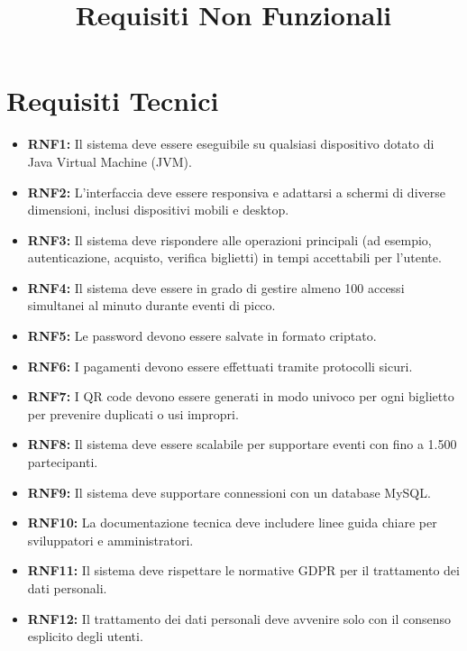 \documentclass[a4paper,12pt]{article}
\title{\textcolor{titlecolor}{\Huge Requisiti Non Funzionali \vspace{0.2cm}}}
\author{}
\date{}
\begin{document}
\maketitle

\section*{\textcolor{sectioncolor}{Requisiti Tecnici}}
\textcolor{textcolor}{
\begin{itemize}
    \item \textbf{RNF1:} Il sistema deve essere eseguibile su qualsiasi dispositivo dotato di Java Virtual Machine (JVM).
    \item \textbf{RNF2:} L'interfaccia deve essere responsiva e adattarsi a schermi di diverse dimensioni, inclusi dispositivi mobili e desktop.
    \item \textbf{RNF3:} Il sistema deve rispondere alle operazioni principali (ad esempio, autenticazione, acquisto, verifica biglietti) in tempi accettabili per l'utente.
    \item \textbf{RNF4:} Il sistema deve essere in grado di gestire almeno 100 accessi simultanei al minuto durante eventi di picco.
    \item \textbf{RNF5:} Le password devono essere salvate in formato criptato.
    \item \textbf{RNF6:} I pagamenti devono essere effettuati tramite protocolli sicuri.
    \item \textbf{RNF7:} I QR code devono essere generati in modo univoco per ogni biglietto per prevenire duplicati o usi impropri.
    \item \textbf{RNF8:} Il sistema deve essere scalabile per supportare eventi con fino a 1.500 partecipanti.
    \item \textbf{RNF9:} Il sistema deve supportare connessioni con un database MySQL.
    \item \textbf{RNF10:} La documentazione tecnica deve includere linee guida chiare per sviluppatori e amministratori.
    \item \textbf{RNF11:} Il sistema deve rispettare le normative GDPR per il trattamento dei dati personali.
    \item \textbf{RNF12:} Il trattamento dei dati personali deve avvenire solo con il consenso esplicito degli utenti.
\end{itemize}
}
\end{document}
